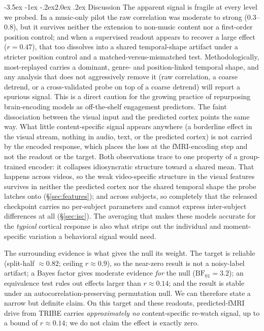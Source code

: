 \documentclass[11pt]{article}
\makeatletter
\renewcommand\section{\@startsection{section}{1}{\z@}%
  {-3.5ex \@plus -1ex \@minus -.2ex}{2.0ex \@plus.2ex}%
  {\normalfont\large\sffamily\bfseries}}
\makeatother
\begin{document}
\section{Discussion}
The apparent signal is fragile at every level we probed. In a music-only pilot the raw correlation
was moderate to strong ($0.3$--$0.8$), but it survives neither the extension to non-music content
nor a first-order position control; and when a supervised readout appears to recover a large effect
($r=0.47$), that too dissolves into a shared temporal-shape artifact under a stricter position
control and a matched-versus-mismatched test. Methodologically, most-replayed
carries a dominant, genre- and position-linked temporal shape, and any analysis that does not
aggressively remove it (raw correlation, a coarse detrend, or a cross-validated probe on top of a
coarse detrend) will report a spurious signal. This is a direct caution for the growing practice of
repurposing brain-encoding models as off-the-shelf engagement predictors. The faint dissociation
between the visual input and the predicted cortex points the same way. What little content-specific
signal appears anywhere (a borderline effect in the visual stream, nothing in audio, text, or the
predicted cortex) is not carried by the encoded response, which places the loss at the
fMRI-encoding step and not the readout or the target. Both observations trace to one property of a
group-trained encoder: it collapses idiosyncratic structure toward a shared mean. That happens
across videos, so the weak video-specific structure in the visual features survives in
neither the predicted cortex nor the shared temporal shape the probe latches onto
(\S\ref{sec:features}); and across subjects, so completely that the released checkpoint carries no
per-subject parameters and cannot express inter-subject differences at all (\S\ref{sec:isc}). The
averaging that makes these models accurate for the \emph{typical} cortical response is also what
strips out the individual and moment-specific variation a behavioral signal would need.

The surrounding evidence is what gives the null its weight. The target is
reliable (split-half $\approx0.82$; ceiling $r\approx0.9$), so the near-zero result is not a
noisy-label artifact; a Bayes factor gives moderate evidence \emph{for} the null
($\mathrm{BF}_{01}=3.2$); an equivalence test rules out effects larger than $r\approx0.14$; and the
result is stable under an autocorrelation-preserving permutation null. We can therefore state a
narrow but definite claim. On this target and these readouts, predicted-fMRI drive from TRIBE
carries \emph{approximately no} content-specific re-watch signal, up to a bound of $r\approx0.14$;
we do not claim the effect is exactly zero.
\end{document}
